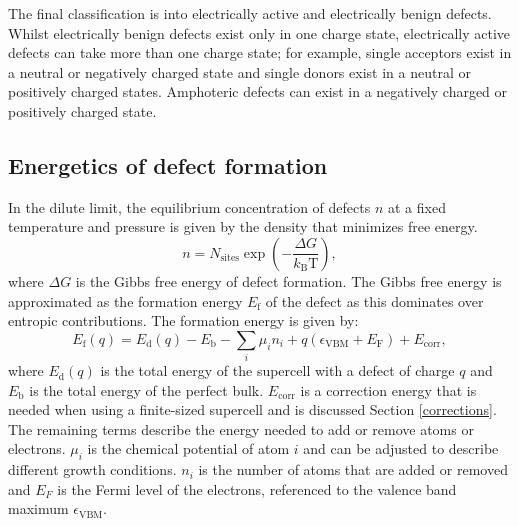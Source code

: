 The final classification is into electrically active and electrically benign defects. Whilst electrically benign defects exist only in one charge state, electrically active defects can take more than one charge state; for example, single acceptors exist in a neutral or negatively charged state and single donors exist in a neutral or positively charged states. Amphoteric defects can exist in a negatively charged or positively charged state.

\subsection{Energetics of defect formation} \label{defectformation}

In the dilute limit, the equilibrium concentration of defects $n$ at a fixed temperature and pressure is given by the density that minimizes free energy.
\begin{equation} \label{defectconcentration}
    n = N_\mathrm{sites} \exp \left(-\frac{\Delta G}{k_\mathrm{B} \mathrm{T}} \right),
\end{equation}
where $\Delta G$ is the Gibbs free energy of defect formation. The Gibbs free energy is approximated as the formation energy $E_\mathrm{f}$ of the defect as this dominates over entropic contributions. The formation energy is given by:
\begin{equation} \label{eqn_formation_energy}
E_\mathrm{f}(q) = E_\mathrm{d}(q) - E_\mathrm{b} - \sum_i \mu_i n_i + q(\epsilon_\mathrm{VBM}+E_\mathrm{F}) + E_\mathrm{corr},
\end{equation}
where $E_\mathrm{d}(q)$ is the total energy of the supercell with a defect of charge $q$ and $E_\mathrm{b}$ is the total energy of the perfect bulk. 
$E_\mathrm{corr}$ is a correction energy that is needed when using a finite-sized supercell and is discussed Section \ref{corrections}.
The remaining terms describe the energy needed to add or remove atoms or electrons.
$\mu_i$ is the chemical potential of atom $i$ and can be adjusted to describe different growth conditions. 
$n_i$ is the number of atoms that are added or removed and $E_F$ is the Fermi level of the electrons, referenced to the valence band maximum $\epsilon_\mathrm{VBM}$.

